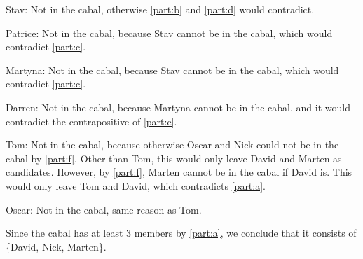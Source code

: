 \documentclass[../main.tex]{subfiles}
\begin{document}
\begin{questions}

\begin{solution}

Stav: Not in the cabal, otherwise \ref{part:b} and \ref{part:d} would contradict.

Patrice: Not in the cabal, because Stav cannot be in the cabal, which would contradict \ref{part:c}.

Martyna: Not in the cabal, because Stav cannot be in the cabal, which would contradict \ref{part:c}.

Darren: Not in the cabal, because Martyna cannot be in the cabal, and it would contradict the contrapositive of \ref{part:e}.

Tom: Not in the cabal, because otherwise Oscar and Nick could not be in the cabal by \ref{part:f}. Other than Tom, this would only leave David and Marten as candidates. However, by \ref{part:f}, Marten cannot be in the cabal if David is. This would only leave Tom and David, which contradicts \ref{part:a}.

Oscar: Not in the cabal, same reason as Tom.

Since the cabal has at least 3 members by \ref{part:a}, we conclude that it consists of \{David, Nick, Marten\}.

\end{solution}

\end{questions}
\end{document}
